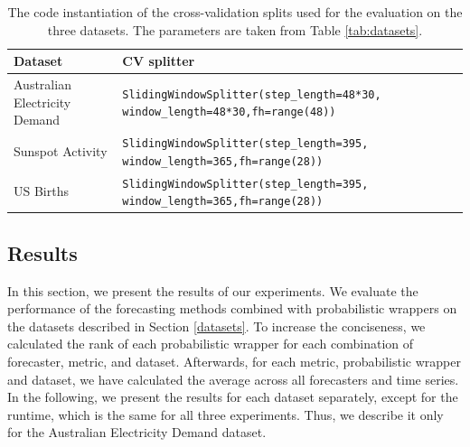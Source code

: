 \begin{table}[h]
    \centering
    \footnotesize
    \caption{The code instantiation of the cross-validation splits used for the evaluation on the three datasets. The parameters are taken from Table \ref{tab:datasets}.}
    \label{tab:cv_splits}
    \begin{tabularx}{\textwidth}{X|X}
         \toprule
        Dataset & CV splitter \\ \midrule
        Australian Electricity Demand & \texttt{SlidingWindowSplitter(step_length=48*30, window_length=48*30,fh=range(48))} \\  
        Sunspot Activity & \texttt{SlidingWindowSplitter(step_length=395, window_length=365,fh=range(28))}\\
        US Births & \texttt{SlidingWindowSplitter(step_length=395, window_length=365,fh=range(28))}\\
        \bottomrule
    \end{tabularx}
\end{table}




\subsection{Results} \label{results}
In this section, we present the results of our experiments. We evaluate the performance of the forecasting methods combined with probabilistic wrappers on the datasets described in Section \ref{datasets}. 
To increase the conciseness, we calculated the rank of each probabilistic wrapper for each combination of forecaster, metric, and dataset. Afterwards, for each metric, probabilistic wrapper and dataset, we have calculated the average across all forecasters and time series. In the following, we present the results for each dataset separately, except for the runtime, which is the same for all three experiments. Thus, we describe it only for the Australian Electricity Demand dataset.



